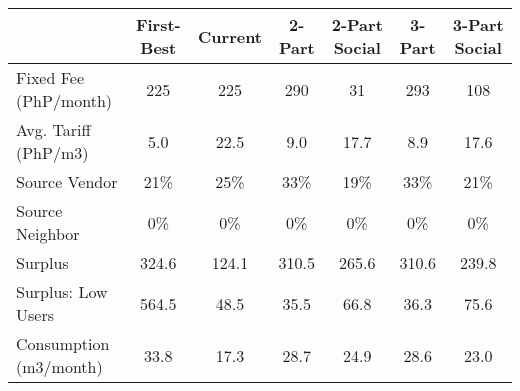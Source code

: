 \begin{tabular}{lcccccc}
  & First-Best & Current & 2-Part  & 2-Part Social  & 3-Part & 3-Part Social \\
\hline
\hline
Fixed Fee (PhP/month) &225&225&290&31&293&108\\
Avg. Tariff (PhP/m3) &5.0&22.5&9.0&17.7&8.9&17.6\\
Source Vendor &21\% &25\% &33\% &19\% &33\% &21\%\\
Source Neighbor &0\% &0\% &0\% &0\% &0\% &0\%\\
Surplus &324.6&124.1&310.5&265.6&310.6&239.8\\
Surplus: Low Users &564.5&48.5&35.5&66.8&36.3&75.6\\
Consumption (m3/month) &33.8&17.3&28.7&24.9&28.6&23.0\\
\hline
\end{tabular}
